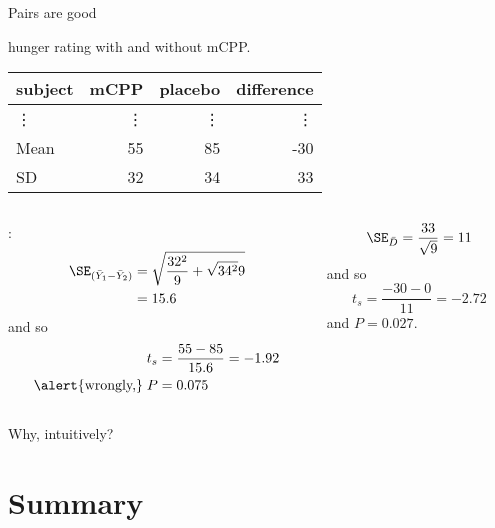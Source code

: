\begin{frame}{Pairs are good}

     hunger rating with and without mCPP.
    \begin{center}
      \begin{tabular}{lrrr}
        \hline
        subject & mCPP & placebo & difference \\ 
        \hline
        \vdots & \vdots & \vdots & \vdots \\
        \hline
         Mean & 55 & 85 & -30 \\ 
         SD & 32 & 34 & 33 \\ 
         \hline
      \end{tabular}
    \end{center}

    \begin{columns}
      \begin{column}{.5\textwidth}
        :
      \begin{align*} 
        \SE_{(\bar Y_1 - \bar Y_2)} &= \sqrt{\frac{32^2}{9} + \sqrt{34^2}{9}} \\ 
        &= 15.6 
        \end{align*}
        and so
        \begin{align*}
      t_s &= \frac{55-85}{15.6} = -1.92  \\
      \text{\alert{wrongly,}} \; P&=0.075
    \end{align*}

      \end{column}
      \begin{column}{.5\textwidth}
        \begin{align*}
          \SE_{\bar D} = \frac{33}{\sqrt{9}} = 11
        \end{align*}
        and so
        \[  t_s = \frac{-30-0}{11} = -2.72 \]
        and $P = 0.027$.

      \end{column}
    \end{columns}

    \alert{Why, intuitively?}

\end{frame}


\section<article>{Summary}
